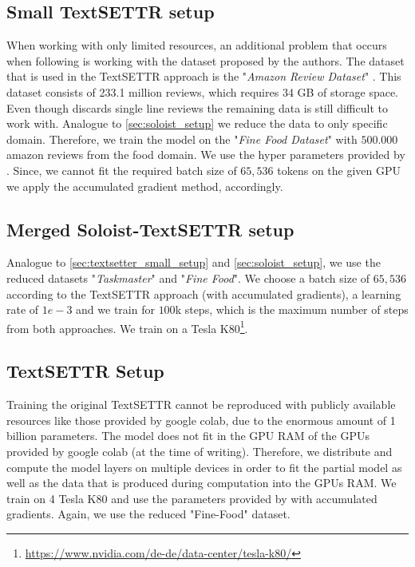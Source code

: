 \documentclass[twocolumn]{tum-article}
\begin{document}
\subsection{Small TextSETTR setup}\label{sec:textsetter_small_setup}
When working with only limited resources, an additional problem that occurs when following \cite{riley2020textsettr} is working with the dataset proposed by the authors. The dataset that is used in the TextSETTR approach is the "\textit{Amazon Review Dataset}" \cite{ni2019justifying}. This dataset consists of 233.1 million reviews, which requires 34 GB of storage space. Even though \cite{riley2020textsettr} discards single line reviews the remaining data is still difficult to work with. Analogue to \autoref{sec:soloist_setup} we reduce the data to only specific domain. Therefore, we train the model on the "\textit{Fine Food Dataset}" \cite{mcauley2013amateurs} with $500.000$ amazon reviews from the food domain. We use the hyper parameters provided by \cite{riley2020textsettr}. Since, we cannot fit the required batch size of $65,536$ tokens on the given GPU we apply the accumulated gradient method, accordingly. 
\subsection{Merged Soloist-TextSETTR setup}\label{sec:soloist_textsettr_setup}
Analogue to \autoref{sec:textsetter_small_setup} and \autoref{sec:soloist_setup}, we use the reduced datasets "\textit{Taskmaster}" and "\textit{Fine Food}". We choose a batch size of $65,536$ according to the TextSETTR approach (with accumulated gradients), a learning rate of $1e-3$ and we train for $100$k steps, which is the maximum number of steps from both approaches. We train on a Tesla K80\footnote{\url{https://www.nvidia.com/de-de/data-center/tesla-k80/}}.
\subsection{TextSETTR Setup}
Training the original TextSETTR cannot be reproduced with publicly available resources like those provided by google colab, due to the enormous amount of 1 billion parameters. The model does not fit in the GPU RAM of the GPUs provided by google colab (at the time of writing). Therefore, we distribute and compute the model layers on multiple devices in order to fit the partial model as well as the data that is produced during computation into the GPUs RAM. We train on 4 Tesla K80 and use the parameters provided by \cite{riley2020textsettr} with accumulated gradients. Again, we use the reduced "Fine-Food" dataset. 
\end{document}
